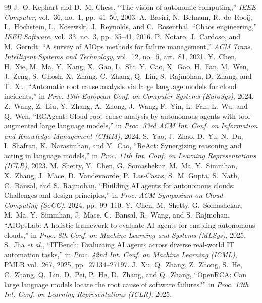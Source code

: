 \documentclass[11pt,a4paper]{article}
\begin{document}
\begin{thebibliography}{99}
\small
{} J.~O. Kephart and D.~M. Chess, ``The vision of autonomic computing,'' \emph{IEEE Computer}, vol.~36, no.~1, pp.~41--50, 2003.
 A.~Basiri, N.~Behnam, R.~de~Rooij, L.~Hochstein, L.~Kosewski, J.~Reynolds, and C.~Rosenthal, ``Chaos engineering,'' \emph{IEEE Software}, vol.~33, no.~3, pp.~35--41, 2016.
 P.~Notaro, J.~Cardoso, and M.~Gerndt, ``A survey of AIOps methods for failure management,'' \emph{ACM Trans. Intelligent Systems and Technology}, vol.~12, no.~6, art.~81, 2021.
 Y.~Chen, H.~Xie, M.~Ma, Y.~Kang, X.~Gao, L.~Shi, Y.~Cao, X.~Gao, H.~Fan, M.~Wen, J.~Zeng, S.~Ghosh, X.~Zhang, C.~Zhang, Q.~Lin, S.~Rajmohan, D.~Zhang, and T.~Xu, ``Automatic root cause analysis via large language models for cloud incidents,'' in \emph{Proc. 19th European Conf. on Computer Systems (EuroSys)}, 2024.
 Z.~Wang, Z.~Liu, Y.~Zhang, A.~Zhong, J.~Wang, F.~Yin, L.~Fan, L.~Wu, and Q.~Wen, ``RCAgent: Cloud root cause analysis by autonomous agents with tool-augmented large language models,'' in \emph{Proc. 33rd ACM Int. Conf. on Information and Knowledge Management (CIKM)}, 2024.
 S.~Yao, J.~Zhao, D.~Yu, N.~Du, I.~Shafran, K.~Narasimhan, and Y.~Cao, ``ReAct: Synergizing reasoning and acting in language models,'' in \emph{Proc. 11th Int. Conf. on Learning Representations (ICLR)}, 2023.
 M.~Shetty, Y.~Chen, G.~Somashekar, M.~Ma, Y.~Simmhan, X.~Zhang, J.~Mace, D.~Vandevoorde, P.~Las-Casas, S.~M. Gupta, S.~Nath, C.~Bansal, and S.~Rajmohan, ``Building AI agents for autonomous clouds: Challenges and design principles,'' in \emph{Proc. ACM Symposium on Cloud Computing (SoCC)}, 2024, pp.~99--110.
 Y.~Chen, M.~Shetty, G.~Somashekar, M.~Ma, Y.~Simmhan, J.~Mace, C.~Bansal, R.~Wang, and S.~Rajmohan, ``AIOpsLab: A holistic framework to evaluate AI agents for enabling autonomous clouds,'' in \emph{Proc. 8th Conf. on Machine Learning and Systems (MLSys)}, 2025.
 S.~Jha \emph{et al.}, ``ITBench: Evaluating AI agents across diverse real-world IT automation tasks,'' in \emph{Proc. 42nd Int. Conf. on Machine Learning (ICML)}, PMLR vol.~267, 2025, pp.~27134--27197.
 J.~Xu, Q.~Zhang, Z.~Zhong, S.~He, C.~Zhang, Q.~Lin, D.~Pei, P.~He, D.~Zhang, and Q.~Zhang, ``OpenRCA: Can large language models locate the root cause of software failures?'' in \emph{Proc. 13th Int. Conf. on Learning Representations (ICLR)}, 2025.

\end{thebibliography}
\end{document}
